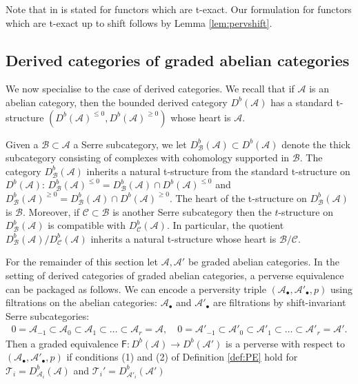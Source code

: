 \documentclass[11pt,reqno]{amsart}
\numberwithin{equation}{section}
\theoremstyle{definition}
\theoremstyle{named}
\newcommand{\cA}{\mathcal{A}}
\newcommand{\cB}{\mathcal{B}}
\newcommand{\cC}{\mathcal{C}}
\newcommand{\sF}{\mathsf{F}}
\newcommand{\cT}{\mathcal{T}}
\begin{document}
Note that in \cite[Lemma 2.4]{LosCacti}  is stated for functors which are t-exact.  Our formulation for functors which are t-exact up to shift follows by Lemma \ref{lem:pervshift}.



\subsection{Derived categories of graded abelian categories}
We now specialise to the case of derived categories.  We recall that if $\cA$ is an abelian category, then the bounded derived category $D^b(\cA)$ has a standard t-structure $(D^b(\cA)^{\leq0},D^b(\cA)^{\geq0})$ whose heart is $\cA$.  

Given a $\cB \subset \cA$ a Serre subcategory, we let $D_\cB^b(\cA) \subset D^b(\cA)$ denote the thick subcategory consisting of complexes with cohomology supported in $\cB$. The category $D_\cB^b(\cA)$ inherits a natural t-structure from the standard t-structure on $D^b(\cA)$: $D_\cB^b(\cA)^{\leq0}=D_\cB^b(\cA) \cap D^b(\cA)^{\leq0}$ and $D_\cB^b(\cA)^{\geq0}=D_\cB^b(\cA) \cap D^b(\cA)^{\geq0}$.  The heart of the t-structure on 
$D_\cB^b(\cA)$ is $\cB$.  Moreover, if $\cC \subset \cB$ is another Serre subcategory then 
the $t$-structure on $D_\cB^b(\cA)$ is compatible with $D_\cC^b(\cA)$.  In particular, the quotient  $D_\cB^b(\cA)/D_\cC^b(\cA)$ inherits a natural t-structure whose heart is $\cB/\cC$.

For the remainder of this section let $\cA,\cA'$ be graded abelian categories.  In the setting of derived categories of graded abelian categories, a perverse equivalence can be packaged as follows.  We can encode a perversity triple $(\mathcal{A}_\bullet, \mathcal{A}'_\bullet, p)$ using filtrations on the abelian categories: $\cA_\bullet$ and $\cA'_\bullet$ are filtrations by shift-invariant Serre subcategories:
\begin{align*}
	0 = \mathcal{A}_{-1} \subset \mathcal{A}_0 \subset \mathcal{A}_1 \subset \hdots \subset \mathcal{A}_r=\mathcal{A}, \quad
	0 = \mathcal{A}'_{-1} \subset \mathcal{A}'_0 \subset \mathcal{A}'_1 \subset \hdots \subset \mathcal{A}'_r=\mathcal{A}'.
	\end{align*}
Then a graded equivalence $\sF:D^b(\mathcal{A}) \to D^b(\mathcal{A}')$ is a perverse with respect to $(\mathcal{A}_\bullet, \mathcal{A}'_\bullet, p)$ if conditions (1) and (2) of Definition \ref{def:PE} hold for $\cT_i=D^b_{\mathcal{A}_i}(\mathcal{A})$ and $\cT_i'=D^b_{\mathcal{A}'_i}(\mathcal{A}')$
\end{document}
